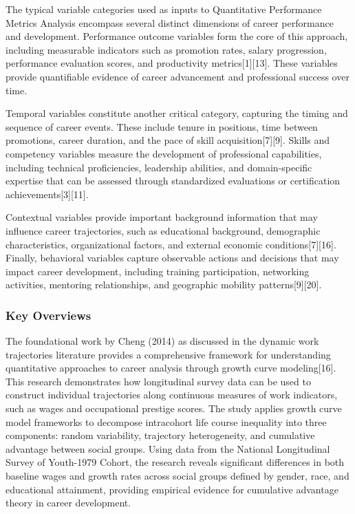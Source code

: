 \documentclass[main.tex]{subfiles}
\begin{document}
The typical variable categories used as inputs to Quantitative Performance Metrics Analysis encompass several distinct dimensions of career performance and development. Performance outcome variables form the core of this approach, including measurable indicators such as promotion rates, salary progression, performance evaluation scores, and productivity metrics[1][13]. These variables provide quantifiable evidence of career advancement and professional success over time.

Temporal variables constitute another critical category, capturing the timing and sequence of career events. These include tenure in positions, time between promotions, career duration, and the pace of skill acquisition[7][9]. Skills and competency variables measure the development of professional capabilities, including technical proficiencies, leadership abilities, and domain-specific expertise that can be assessed through standardized evaluations or certification achievements[3][11].

Contextual variables provide important background information that may influence career trajectories, such as educational background, demographic characteristics, organizational factors, and external economic conditions[7][16]. Finally, behavioral variables capture observable actions and decisions that may impact career development, including training participation, networking activities, mentoring relationships, and geographic mobility patterns[9][20].

\subsubsection{Key Overviews}

The foundational work by Cheng (2014) as discussed in the dynamic work trajectories literature provides a comprehensive framework for understanding quantitative approaches to career analysis through growth curve modeling[16]. This research demonstrates how longitudinal survey data can be used to construct individual trajectories along continuous measures of work indicators, such as wages and occupational prestige scores. The study applies growth curve model frameworks to decompose intracohort life course inequality into three components: random variability, trajectory heterogeneity, and cumulative advantage between social groups. Using data from the National Longitudinal Survey of Youth-1979 Cohort, the research reveals significant differences in both baseline wages and growth rates across social groups defined by gender, race, and educational attainment, providing empirical evidence for cumulative advantage theory in career development.
\end{document}
